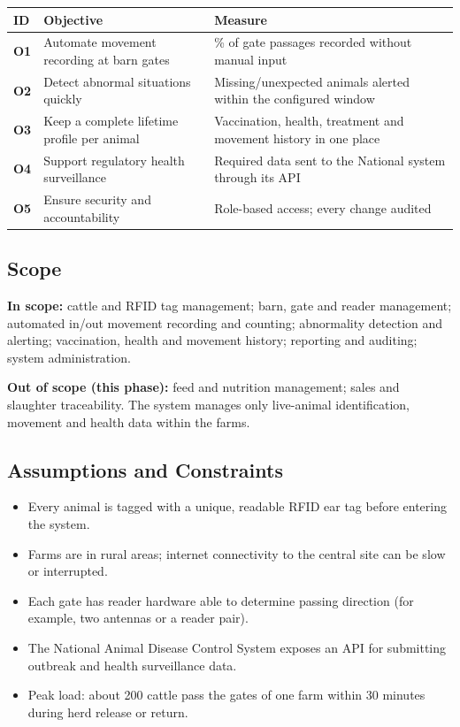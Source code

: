 {\small
\begin{longtable}[]{|>{\raggedright\arraybackslash}p{}|>{\raggedright\arraybackslash}p{}|>{\raggedright\arraybackslash}p{}|}
\hline
\textbf{ID} & \textbf{Objective} & \textbf{Measure} \\ \hline
\endhead
\textbf{O1} & Automate movement recording at barn gates & 100\% of gate
passages recorded without manual input \\ \hline
\textbf{O2} & Detect abnormal situations quickly & Missing/unexpected
animals alerted within the configured window \\ \hline
\textbf{O3} & Keep a complete lifetime profile per animal & Vaccination,
health, treatment and movement history in one place \\ \hline
\textbf{O4} & Support regulatory health surveillance & Required data
sent to the National system through its API \\ \hline
\textbf{O5} & Ensure security and accountability & Role-based access;
every change audited \\ \hline
\end{longtable}
}

\subsection{Scope}\label{sec:1.4}

\textbf{In scope:} cattle and RFID tag management; barn, gate and reader
management; automated in/out movement recording and counting;
abnormality detection and alerting; vaccination, health and movement
history; reporting and auditing; system administration.

\textbf{Out of scope (this phase):} feed and nutrition management; sales
and slaughter traceability. The system manages only live-animal
identification, movement and health data within the farms.

\subsection{Assumptions and Constraints}\label{sec:1.5}

\begin{itemize}
\item
  Every animal is tagged with a unique, readable RFID ear tag before
  entering the system.
\item
  Farms are in rural areas; internet connectivity to the central site
  can be slow or interrupted.
\item
  Each gate has reader hardware able to determine passing direction (for
  example, two antennas or a reader pair).
\item
  The National Animal Disease Control System exposes an API for
  submitting outbreak and health surveillance data.
\item
  Peak load: about 200 cattle pass the gates of one farm within 30
  minutes during herd release or return.
\end{itemize}

